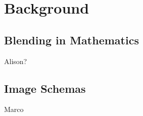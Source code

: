 \section{Background}
\label{background}

\subsection{Blending in Mathematics}
\label{mathblend}

  Alison?

\subsection{Image Schemas}  
\label{schemas}

Marco

